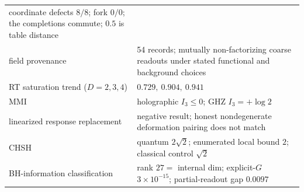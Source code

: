 \begin{longtable}[]{@{}ll@{}}
\begin{minipage}[t]{0.47\columnwidth}
coordinate defects \(8/8\); fork \(0/0\); the completions commute; \(0.5\) is table distance\strut
\end{minipage}\tabularnewline
\begin{minipage}[t]{0.47\columnwidth}\raggedright
field provenance\strut
\end{minipage} & \begin{minipage}[t]{0.47\columnwidth}\raggedright
54 records; mutually non-factorizing coarse readouts under stated functional and background choices\strut
\end{minipage}\tabularnewline
\begin{minipage}[t]{0.47\columnwidth}\raggedright
RT saturation trend (\(D=2,3,4\))\strut
\end{minipage} & \begin{minipage}[t]{0.47\columnwidth}\raggedright
\(0.729,\ 0.904,\ 0.941\)\strut
\end{minipage}\tabularnewline
\begin{minipage}[t]{0.47\columnwidth}\raggedright
MMI\strut
\end{minipage} & \begin{minipage}[t]{0.47\columnwidth}\raggedright
holographic \(I_3 \le 0\); GHZ \(I_3 = +\log 2\)\strut
\end{minipage}\tabularnewline
\begin{minipage}[t]{0.47\columnwidth}\raggedright
linearized response replacement\strut
\end{minipage} & \begin{minipage}[t]{0.47\columnwidth}\raggedright
negative result; honest nondegenerate deformation pairing does not match\strut
\end{minipage}\tabularnewline
\begin{minipage}[t]{0.47\columnwidth}\raggedright
CHSH\strut
\end{minipage} & \begin{minipage}[t]{0.47\columnwidth}\raggedright
quantum \(2\sqrt2\); enumerated local bound \(2\); classical control \(\sqrt2\)\strut
\end{minipage}\tabularnewline
\begin{minipage}[t]{0.47\columnwidth}\raggedright
BH-information classification\strut
\end{minipage} & \begin{minipage}[t]{0.47\columnwidth}\raggedright
rank \(27 =\) internal dim; explicit-\(G\) \(3\times10^{-15}\); partial-readout gap \(0.0097\)\strut
\end{minipage}\tabularnewline

\end{longtable}
